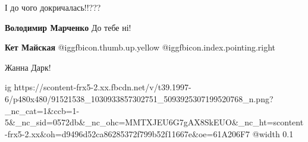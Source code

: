  
 
 
 
 
І до чого докричалась!!???

\textbf{Володимир Марченко} До тебе ні!

\textbf{Кет Майская}  @igg{fbicon.thumb.up.yellow}  @igg{fbicon.index.pointing.right} 

Жанна Дарк!


\ifcmt
  ig https://scontent-frx5-2.xx.fbcdn.net/v/t39.1997-6/p480x480/91521538_1030933857302751_5093925307199520768_n.png?_nc_cat=1&ccb=1-5&_nc_sid=0572db&_nc_ohc=MMTXJEU6G7gAX8SkEUO&_nc_ht=scontent-frx5-2.xx&oh=d9496d52ca86285372f799b52f11667e&oe=61A206F7
  @width 0.1
\fi
